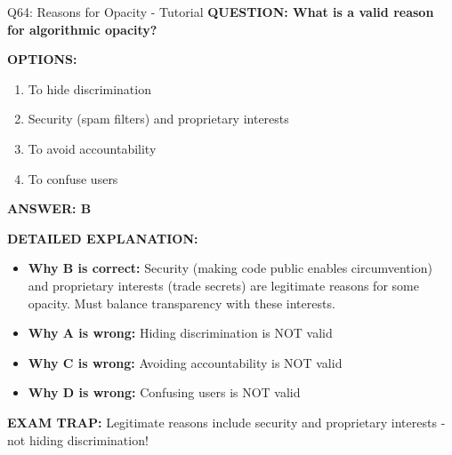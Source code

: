 \documentclass[8pt]{beamer}
\begin{document}
	\begin{frame}{Q64: Reasons for Opacity - Tutorial}
		\fontsize{6.5}{7.5}\selectfont
		\textbf{QUESTION: What is a valid reason for algorithmic opacity?}
		
		\vspace{0.1cm}
		\textbf{OPTIONS:}
		\begin{enumerate}
			\item To hide discrimination
			\item Security (spam filters) and proprietary interests
			\item To avoid accountability
			\item To confuse users
		\end{enumerate}
		
		\vspace{0.1cm}
		\textcolor{myblue}{\textbf{ANSWER: B}}
		
		\vspace{0.1cm}
		\textbf{DETAILED EXPLANATION:}
		\begin{itemize}
			\item \textbf{Why B is correct:} Security (making code public enables circumvention) and proprietary interests (trade secrets) are legitimate reasons for some opacity. Must balance transparency with these interests.
			\item \textbf{Why A is wrong:} Hiding discrimination is NOT valid
			\item \textbf{Why C is wrong:} Avoiding accountability is NOT valid
			\item \textbf{Why D is wrong:} Confusing users is NOT valid
		\end{itemize}
		
		\textcolor{myred}{\textbf{EXAM TRAP:}} Legitimate reasons include \textcolor{myblue}{security and proprietary interests} - not hiding discrimination!
	\end{frame}
	
\end{document}

